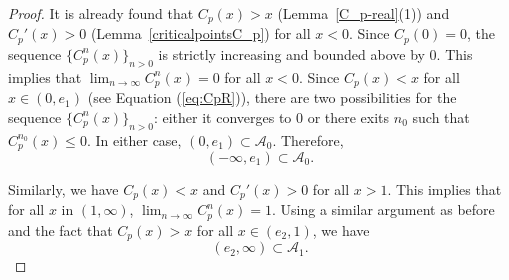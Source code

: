 \documentclass[12pt]{article}
\begin{document}
\begin{proof}
It is already found that $C_p(x)>x$  (Lemma~\ref{C_p-real}(1)) and $C_p'(x)>0$  (Lemma~\ref{criticalpointsC_p}) for all $x< 0$. Since $C_p(0)=0$, the sequence $\{C_p^n(x)\}_{n>0}$ is strictly increasing and bounded above by $0.$ This implies that  $\lim_{n \to \infty}C_p^n(x)=0 $ for all $x<0$.
  Since $C_p(x)<x$ for all $x \in (0,e_1)$ (see Equation (\ref{eq:CpR})), there are two possibilities for the sequence $\{C_p ^n (x)\}_{n>0}$: either it converges to $0$ or there exits $n_0$ such that $C_p ^{n_0} (x) \leq 0$. In either case, $(0, e_1) \subset  \mathcal{A}_0$.  
Therefore,  $$(-\infty,e_1)\subset \mathcal{A}_0.$$ 
	
Similarly, we have $C_p(x)<x$ and $C_p'(x)>0$ for all $x>1$. This implies that for all $x$ in $(1,\infty)$, $\lim_{n \to \infty}C_p^n(x)=1.$
 Using a similar argument as before and the fact that $C_p (x)> x$ for all $x \in (e_2, 1)$, we have   $$(e_2,\infty)\subset \mathcal{A}_1.$$


\end{proof}
\end{document}
